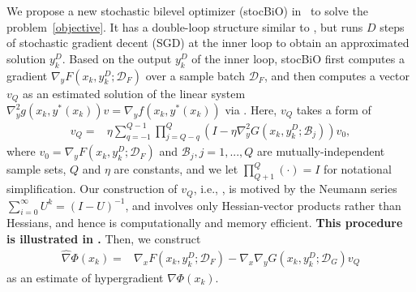 \documentclass{osudissert96}
\def\gB{{\mathcal{B}}}
\def\gD{{\mathcal{D}}}
\newtheorem{proposition}{Proposition}
\begin{document}
We  propose a new stochastic bilevel optimizer (stocBiO) in~ to solve the problem~\cref{objective}. 
It has a double-loop structure similar to , but  runs $D$ steps of stochastic gradient decent (SGD) at the inner loop to obtain an approximated solution  $y_k^D$.  %
Based on the output $y_k^D$ of the inner loop, stocBiO first computes a gradient {\small $\nabla_y F(x_k,y_k^D;\gD_F)$} over a sample batch $\gD_F$, and then computes a vector $v_Q$ as an estimated solution  of the linear system {\small $ \nabla_y^2 g(x_k,y^*(x_k))v=
\nabla_y f(x_k,y^*(x_k))$} via . Here, $v_Q$  takes a form of 
\begin{align}\label{ours:est}
v_Q =& \eta \sum_{q=-1}^{Q-1}\prod_{j=Q-q}^Q (I - \eta \nabla_y^2G(x_k,y_k^D;\gB_j)) v_0,
\end{align}
where {\small$v_0 = \nabla_y F(x_k,y_k^D;\gD_F)$} and $\gB_j,j=1,...,Q$ are mutually-independent sample sets, $Q$ and $\eta$ are constants, and we let $\prod_{Q+1}^Q (\cdot)= I$ for notational simplification.  %
Our construction of $v_Q$, i.e., , is motived by the Neumann series $\sum_{i=0}^\infty U^k=(I-U)^{-1}$, and involves only Hessian-vector products rather than Hessians, and hence is computationally and memory efficient.  {\bf This procedure is illustrated in .} Then, we construct 
 \begin{align}\label{estG}
 \widehat \nabla \Phi(x_k) =&  \nabla_x F(x_k,y_k^D;\gD_F)-\nabla_x \nabla_y G(x_k,y_k^D;\gD_G)v_Q
 \end{align}
as an estimate of hypergradient $\nabla \Phi(x_k)$. %
\end{document}

